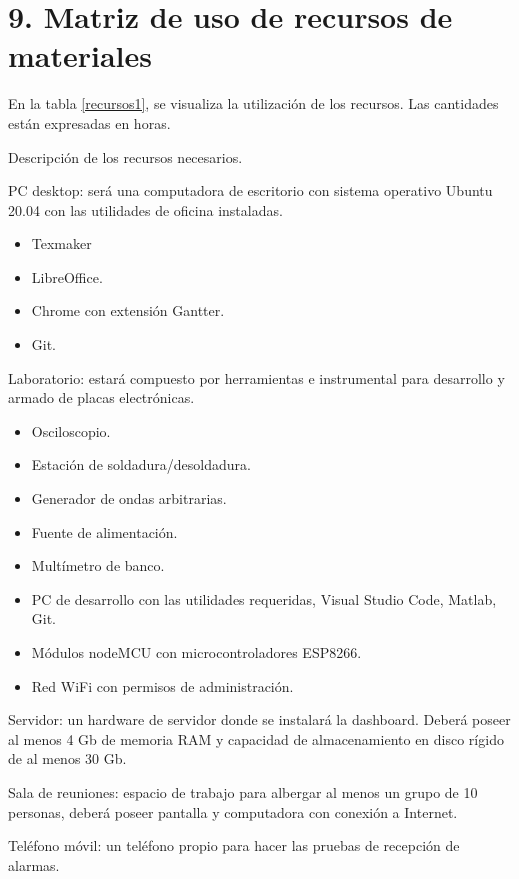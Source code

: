 \section{9. Matriz de uso de recursos de materiales}
\label{sec:recursos}
En la tabla \ref{recursos1}, se visualiza la utilización de los recursos. Las cantidades están expresadas en horas.

Descripción de los recursos necesarios.

PC desktop: será una computadora de escritorio con sistema operativo Ubuntu 20.04 con las utilidades de oficina instaladas.
\begin{itemize}
\item Texmaker
\item LibreOffice.
\item Chrome con extensión Gantter.
\item Git.
\end{itemize}

Laboratorio: estará compuesto por herramientas e instrumental para desarrollo y armado de placas electrónicas.
\begin{itemize}
\item Osciloscopio.
\item Estación de soldadura/desoldadura.
\item Generador de ondas arbitrarias.
\item Fuente de alimentación.
\item Multímetro de banco.
\item PC de desarrollo con las utilidades requeridas, Visual Studio Code, Matlab, Git.
\item Módulos nodeMCU con microcontroladores ESP8266.
\item Red WiFi con permisos de administración.
\end{itemize}

Servidor: un hardware de servidor donde se instalará la dashboard. Deberá poseer al menos 4 Gb de memoria RAM y capacidad de almacenamiento en disco rígido de al menos 30 Gb. 

Sala de reuniones: espacio de trabajo para albergar al menos un grupo de 10 personas, deberá poseer pantalla y computadora con conexión a Internet.

Teléfono móvil: un teléfono propio para hacer las pruebas de recepción de alarmas.

